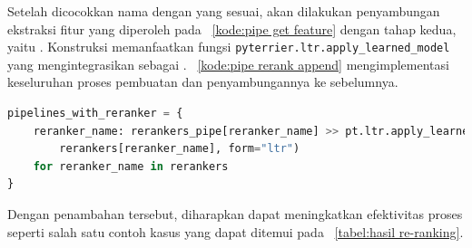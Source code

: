 Setelah dicocokkan nama dengan \pipeline{} yang sesuai, akan dilakukan penyambungan \pipeline{} ekstraksi fitur yang diperoleh pada \kode{}~\ref{kode:pipe get feature} dengan \pipeline{} tahap \ranking{} kedua, yaitu \pipeline{} \reranker{}. Konstruksi \pipeline{} \reranker{} memanfaatkan fungsi \lstinline{pyterrier.ltr.apply_learned_model} yang mengintegrasikan \lambdamart{} sebagai \pipeline{}. \kode{}~\ref{kode:pipe rerank append} mengimplementasi keseluruhan proses pembuatan \pipeline{} \reranker{} dan penyambungannya ke \pipeline{} sebelumnya.
\begin{lstlisting}[language=Python, caption={Pembuatan dan penyambungan \pipeline{} \reranker{}}, label={kode:pipe rerank append}]
pipelines_with_reranker = {
    reranker_name: rerankers_pipe[reranker_name] >> pt.ltr.apply_learned_model(
        rerankers[reranker_name], form="ltr")
    for reranker_name in rerankers
}\end{lstlisting}
Dengan penambahan \reranker{} tersebut, diharapkan dapat meningkatkan efektivitas proses \retrieval{} seperti salah satu contoh kasus yang dapat ditemui pada \tabel{}~\ref{tabel:hasil re-ranking}.

\begin{table}[H]
    \centering
    \caption{Cuplikan peningkatan hasil \reranking{}}
    \label{tabel:hasil re-ranking}
\end{table}

